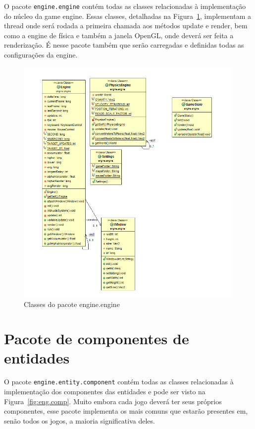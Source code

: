 \documentclass[12pt, 
openright, 
oneside, 
a4paper,    
brazil]{facom-ufu-abntex2}
\begin{document}
O pacote \texttt{engine.engine} contém todas as classes relacionadas à implementação do núcleo da game engine. Essas classes, detalhadas na Figura~\ref{fig:eng.eng}, implementam a thread onde será rodada a primeira chamada aos métodos update e render, bem como a engine de física e também a janela OpenGL, onde deverá ser feita a renderização. É nesse pacote também que serão carregadas e definidas todas as configurações da engine.

\begin{figure}[H]
	\centering
	\includegraphics[width=30em]{imagens/engine.engine.png}
	\caption{Classes do pacote engine.engine\label{fig:eng.eng}}
\end{figure}

\section{Pacote de componentes de entidades}

O pacote \texttt{engine.entity.component} contém todas as classes relacionadas à implementação dos componentes das entidades e pode ser visto na Figura~\ref{fig:eng.comp}. Muito embora cada jogo deverá ter seus próprios componentes, esse pacote implementa os mais comuns que estarão presentes em, senão todos os jogos, a maioria significativa deles.
\end{document}
